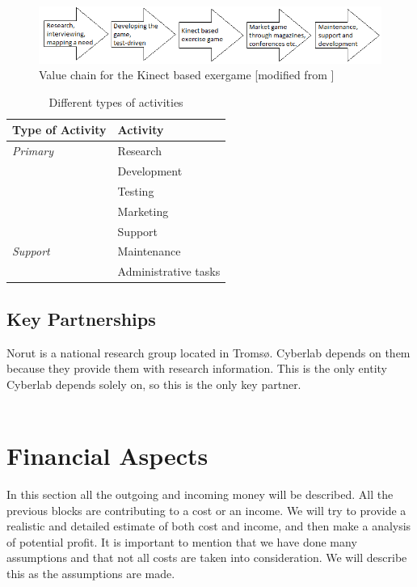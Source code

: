 \begin{figure}
\begin{center}
\includegraphics[scale=0.7]{valuechaincase}
\caption[Value Chain for the Kinect Based Exergame]{Value chain for the Kinect based exergame [modified from \cite{osterwalderthesis}]}
\label{fig:ValueChainCase}
\end{center}
\end{figure}

\begin{table}
\centering
    \begin{tabular}{|l|l|}
        \hline
        \textbf{Type of Activity} & \textbf{Activity} \\ \hline
        \emph{Primary} & Research \\ \cline{2-2}
        & Development \\ \cline{2-2}
	 	& Testing \\ \cline{2-2}
	 	& Marketing \\ \cline{2-2}
	 	& Support \\ \hline
	 	 \emph{Support} & Maintenance \\ \cline{2-2}
	   	& Administrative tasks \\
       \hline
    \end{tabular}
    \caption[Different types of activities ]{Different types of activities}
    \label{tab:activities}
\end{table}

\newpage

\subsection{Key Partnerships}

Norut is a national research group located in Tromsø. Cyberlab depends on them because they provide them with research information. This is the only entity Cyberlab depends solely on, so this is the only key partner. \\ \\ 

\section{Financial Aspects}
In this section all the outgoing and incoming money will be described. All the previous blocks are contributing to a cost or an income. We will try to provide a realistic and detailed estimate of both cost and income, and then make a analysis of potential profit. It is important to mention that we have done many assumptions and that not all costs are taken into consideration. We will describe this as the assumptions are made.

